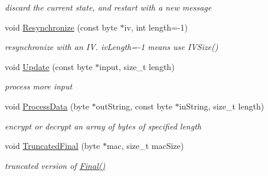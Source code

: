 \begin{DoxyCompactItemize}
\begin{DoxyCompactList}\small\item\em discard the current state, and restart with a new message \item\end{DoxyCompactList}\item 
\hypertarget{class_authenticated_symmetric_cipher_base_a2569e019253053096a8ba1064be4e48e}{
void \hyperlink{class_authenticated_symmetric_cipher_base_a2569e019253053096a8ba1064be4e48e}{Resynchronize} (const byte $\ast$iv, int length=-\/1)}
\label{class_authenticated_symmetric_cipher_base_a2569e019253053096a8ba1064be4e48e}

\begin{DoxyCompactList}\small\item\em resynchronize with an IV. ivLength=-\/1 means use IVSize() \item\end{DoxyCompactList}\item 
\hypertarget{class_authenticated_symmetric_cipher_base_a7e63b051cf0ea30d9c69a5355424c0bc}{
void \hyperlink{class_authenticated_symmetric_cipher_base_a7e63b051cf0ea30d9c69a5355424c0bc}{Update} (const byte $\ast$input, size\_\-t length)}
\label{class_authenticated_symmetric_cipher_base_a7e63b051cf0ea30d9c69a5355424c0bc}

\begin{DoxyCompactList}\small\item\em process more input \item\end{DoxyCompactList}\item 
void \hyperlink{class_authenticated_symmetric_cipher_base_a2887c0e4c7e303bdb51dfd869b16189f}{ProcessData} (byte $\ast$outString, const byte $\ast$inString, size\_\-t length)
\begin{DoxyCompactList}\small\item\em encrypt or decrypt an array of bytes of specified length \item\end{DoxyCompactList}\item 
\hypertarget{class_authenticated_symmetric_cipher_base_acd833963b6abcfabc9ada275fbea8625}{
void \hyperlink{class_authenticated_symmetric_cipher_base_acd833963b6abcfabc9ada275fbea8625}{TruncatedFinal} (byte $\ast$mac, size\_\-t macSize)}
\label{class_authenticated_symmetric_cipher_base_acd833963b6abcfabc9ada275fbea8625}

\begin{DoxyCompactList}\small\item\em truncated version of \hyperlink{class_hash_transformation_aa0b8c7a110d8968268fd02ec32b9a8e8}{Final()} \item\end{DoxyCompactList}\end{DoxyCompactItemize}
